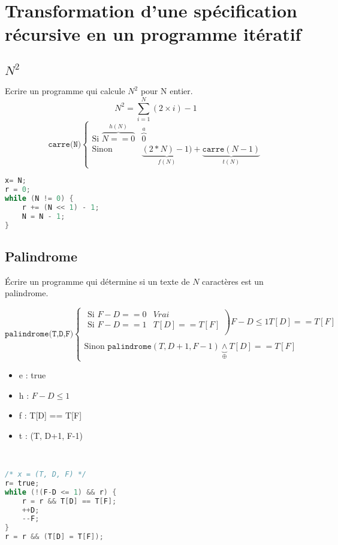 \section{Transformation d'une spécification récursive en un programme itératif}
\subsection{$N^2$}
Ecrire un programme qui calcule $N^2$ pour N entier. 
$$N^2 = \sum^N_{i=1}(2\times i)-1$$
\begin{displaymath}
	\texttt{carre(N)}
	\left\{
	\begin{array}{ll}
		\textrm{Si } \overbrace{N == 0}^{h(N)} & \overbrace{0}^{a}\\
		\textrm{Sinon } & \underbrace{(2*N)-1)}_{f(N)}+\underbrace{\texttt{carre}(N-1)}_{t(N)}
	\end{array}
	\right.
\end{displaymath}


\begin{lstlisting}[language=C]
x= N;
r = 0;
while (N != 0) {
	r += (N << 1) - 1;
	N = N - 1;
}
\end{lstlisting}

\subsection{Palindrome}
Écrire un programme qui détermine si un texte de $N$ caractères est un palindrome.

\begin{displaymath}
	\texttt{palindrome(T,D,F)}
	\left\{
	\begin{array}{ll}
		\left.
		\begin{array}{ll}
		\textrm{Si } F - D == 0 & Vrai \\
		\textrm{Si } F - D == 1 & T[D] == T[F] \\
		\end{array}
		\right) F-D \leq 1 T[D] ==  T[F]
		\\ &\\
		\textrm{Sinon } \texttt{palindrome}(T,D+1,F-1) \underbrace{\wedge}_{\oplus} T[D] == T[F]&
	\end{array}
	\right.
\end{displaymath}
\begin{itemize}
	\item e : true
	\item h : $F - D \leq 1$
	\item f : T[D] ==  T[F]
	\item t : (T, D+1, F-1)
\end{itemize}

 ~\\
\begin{lstlisting}[language=C]
/* x = (T, D, F) */
r= true;
while (!(F-D <= 1) && r) {
	r = r && T[D] == T[F];
	++D;
	--F;
}
r = r && (T[D] = T[F]);
\end{lstlisting}
